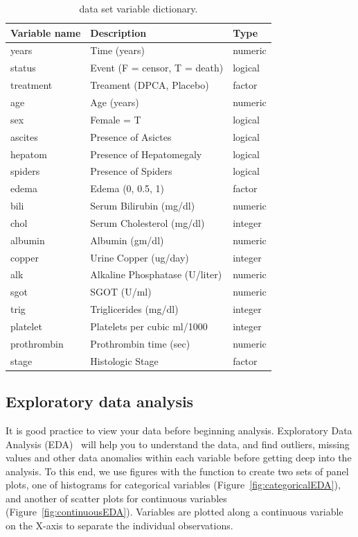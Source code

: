\documentclass[nojss]{jss}
\begin{document}
\begin{table}

\caption{\label{T:dataLabs} data set variable dictionary.}
\centering
\begin{tabular}[t]{lll}
\toprule
Variable name & Description & Type\\
\midrule
years & Time (years) & numeric\\
status & Event (F = censor, T = death) & logical\\
treatment & Treament (DPCA, Placebo) & factor\\
age & Age (years) & numeric\\
sex & Female = T & logical\\
\addlinespace
ascites & Presence of Asictes & logical\\
hepatom & Presence of Hepatomegaly & logical\\
spiders & Presence of Spiders & logical\\
edema & Edema (0, 0.5, 1) & factor\\
bili & Serum Bilirubin (mg/dl) & numeric\\
\addlinespace
chol & Serum Cholesterol (mg/dl) & integer\\
albumin & Albumin (gm/dl) & numeric\\
copper & Urine Copper (ug/day) & integer\\
alk & Alkaline Phosphatase (U/liter) & numeric\\
sgot & SGOT (U/ml) & numeric\\
\addlinespace
trig & Triglicerides (mg/dl) & integer\\
platelet & Platelets per cubic ml/1000 & integer\\
prothrombin & Prothrombin time (sec) & numeric\\
stage & Histologic Stage & factor\\
\bottomrule
\end{tabular}
\end{table}



\subsection{Exploratory data analysis}\label{S:eda}

It is good practice to view your data before beginning analysis. Exploratory Data Analysis (EDA)~\cite{Tukey:1977} will help you to understand the data, and find outliers, missing values and other data anomalies within each variable before getting deep into the analysis. To this end, we use  figures with the  function to create two sets of panel plots, one of histograms for categorical variables  (Figure~\ref{fig:categoricalEDA}), and another of scatter plots for continuous variables (Figure~\ref{fig:continuousEDA}). Variables are plotted along a continuous variable on the X-axis to separate the individual observations.
\end{document}
